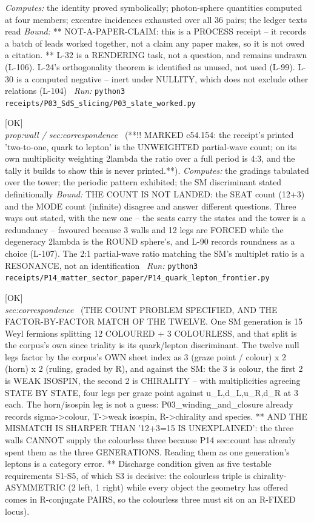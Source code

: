 \begin{description}
\emph{Computes:} the identity proved symbolically; photon-sphere quantities computed at four members; excentre incidences exhausted over all 36 pairs; the ledger texts read
 \emph{Bound:} ** NOT-A-PAPER-CLAIM: this is a PROCESS receipt -- it records a batch of leads worked together, not a claim any paper makes, so it is not owed a citation. ** L-32 is a RENDERING task, not a question, and remains undrawn (L-106). L-24's orthogonality theorem is identified as unused, not used (L-99). L-30 is a computed negative -- inert under NULLITY, which does not exclude other relations (L-104)
\ \emph{Run:} \texttt{python3 receipts/P03\_SdS\_slicing/P03\_slate\_worked.py}
\item[\label{rcpt:P14_quark_lepton_frontier}\texttt{P14\_quark\_lepton\_frontier}]\hfill\textsf{[OK]}\\
\textit{prop:wall / sec:correspondence} \ (**!! MARKED c54.154: the receipt's printed 'two-to-one, quark to lepton' is the UNWEIGHTED partial-wave count; on its own multiplicity weighting 2\textbar{}lambda\textbar{} the ratio over a full period is 4:3, and the tally it builds to show this is never printed.**). 
\emph{Computes:} the gradings tabulated over the tower; the periodic pattern exhibited; the SM discriminant stated definitionally
 \emph{Bound:} THE COUNT IS NOT LANDED: the SEAT count (12+3) and the MODE count (infinite) disagree and answer different questions. Three ways out stated, with the new one -- the seats carry the states and the tower is a redundancy -- favoured because 3 walls and 12 legs are FORCED while the degeneracy 2\textbar{}lambda\textbar{} is the ROUND sphere's, and L-90 records roundness as a choice (L-107). The 2:1 partial-wave ratio matching the SM's multiplet ratio is a RESONANCE, not an identification
\ \emph{Run:} \texttt{python3 receipts/P14\_matter\_sector\_paper/P14\_quark\_lepton\_frontier.py}
\item[\label{rcpt:P14_the_count_specified}\texttt{P14\_the\_count\_specified}]\hfill\textsf{[OK]}\\
\textit{sec:correspondence} \ (THE COUNT PROBLEM SPECIFIED, AND THE FACTOR-BY-FACTOR MATCH OF THE TWELVE. One SM generation is 15 Weyl fermions splitting 12 COLOURED + 3 COLOURLESS, and that split is the corpus's own since triality is its quark/lepton discriminant. The twelve null legs factor by the corpus's OWN sheet index as 3 (graze point / colour) x 2 (horn) x 2 (ruling, graded by R), and against the SM: the 3 is colour, the first 2 is WEAK ISOSPIN, the second 2 is CHIRALITY -- with multiplicities agreeing STATE BY STATE, four legs per graze point against u\_L,d\_L,u\_R,d\_R at 3 each. The horn/isospin leg is not a guess: P03\_winding\_and\_closure already records sigma->colour, T->weak isospin, R->chirality and species. ** AND THE MISMATCH IS SHARPER THAN '12+3=15 IS UNEXPLAINED': the three walls CANNOT supply the colourless three because P14 sec:count has already spent them as the three GENERATIONS. Reading them as one generation's leptons is a category error. ** Discharge condition given as five testable requirements S1-S5, of which S3 is decisive: the colourless triple is chirality-ASYMMETRIC (2 left, 1 right) while every object the geometry has offered comes in R-conjugate PAIRS, so the colourless three must sit on an R-FIXED locus). 

\end{description}
